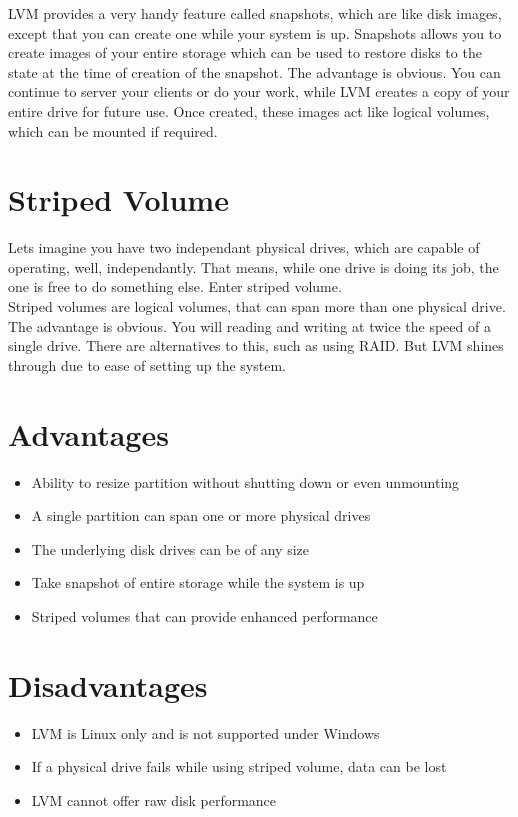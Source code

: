 LVM provides a very handy feature called snapshots, which are like disk images,
except that you can create one while your system is up. Snapshots allows you to
create images of your entire storage which can be used to restore disks to the
state at the time of creation of the snapshot. The advantage is obvious. You can
continue to server your clients or do your work, while LVM creates a copy of
your entire drive for future use. Once created, these images act like logical
volumes, which can be mounted if required.

\section{Striped Volume}
Lets imagine you have two independant physical drives, which are capable of
operating, well, independantly. That means, while one drive is doing its job,
the one is free to do something else. Enter striped volume.\\

Striped volumes are logical volumes, that can span more than one physical drive.
The advantage is obvious. You will reading and writing at twice the speed of
a single drive. There are alternatives to this, such as using RAID. But LVM
shines through due to ease of setting up the system.

\section{Advantages}
\begin{itemize}
    \item Ability to resize partition without shutting down or even unmounting
    \item A single partition can span one or more physical drives
    \item The underlying disk drives can be of any size
    \item Take snapshot of entire storage while the system is up
    \item Striped volumes that can provide enhanced performance
\end{itemize}

\section{Disadvantages}
\begin{itemize}
    \item LVM is Linux only and is not supported under Windows
    \item If a physical drive fails while using striped volume, data can be lost
    \item LVM cannot offer raw disk performance
\end{itemize}


